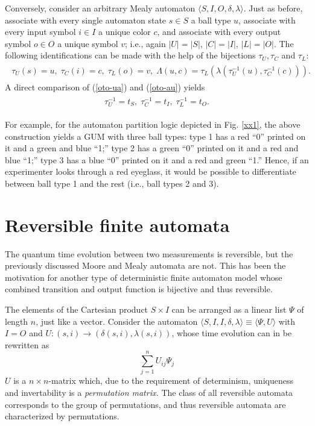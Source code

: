 \documentclass{llncs}
\begin{document}
Conversely,
consider an arbitrary Mealy automaton $\langle S,I,O,\delta ,\lambda \rangle$.
Just as before, associate with every single automaton state $s\in S$
a ball type $u$,
associate with every input symbol $i\in I$
a unique color $c$,
and
associate with every output symbol $o\in O$
a unique symbol $v$; i.e., again
$\vert U\vert =\vert S\vert$,
$\vert C\vert =\vert I\vert$,
$\vert L\vert =\vert O\vert$.
The following identifications can be made
with the help of  the bijections $\tau_U,\tau_C$ and $\tau_L$:
\begin{eqnarray}
\begin{array}{llllll}
\tau_U(s)=u, \; \tau_C(i)=c, \;  \tau_L(o)=v, \;
\Lambda  (u,c) = \tau_L (\lambda (\tau_U^{-1}(u),\tau_C^{-1}(c))).
\end{array}
\label{oto-au}
\end{eqnarray}
A direct comparison of
(\ref{oto-ua})
and
(\ref{oto-au})
yields
\begin{eqnarray}
\begin{array}{llllll}
\tau_U^{-1}=t_S, \; \tau_C^{-1}=t_I, \;  \tau_L^{-1}=t_O.
\end{array}
\label{oto-oto}
\end{eqnarray}

For example, for the automaton partition logic
depicted in Fig. \ref{xx1}, the above  construction yields
a GUM with three ball types:
type 1 has a red ``0'' printed on it and a green and blue ``1;''
type 2 has a green ``0'' printed on it and a red and blue ``1;''
type 3 has a blue ``0'' printed on it and a red and green ``1.''
Hence, if an experimenter looks through a red eyeglass, it would be possible
to differentiate between
ball type 1 and the rest (i.e., ball types 2 and 3).

\section{Reversible finite automata}
The quantum time evolution between two measurements is reversible,
but the previously discussed Moore and Mealy automata are not.
This has been the motivation for another type of deterministic finite automaton
model \cite{sv-aut-rev,svozil-ql}
whose combined transition and output function is bijective and thus reversible.

The elements of the Cartesian product
$S\times I$ can be arranged as a linear list $\Psi$ of length
$n$, just like a vector.
Consider the automaton $\langle S,I,I,\delta ,\lambda \rangle \equiv \langle \Psi , U \rangle$
with
$I=O$ and $U:(s,i)\rightarrow (\delta(s,i),\lambda (s,i))$,
whose time evolution can in be rewritten as
\begin{equation}
\sum_{j=1}^n U_{ij}\Psi_j
\end{equation}
$U$ is a $n\times n$-matrix which, due to the requirement
of determinism, uniqueness and invertability is a {\em permutation matrix.}
The class of all reversible automata corresponds to the group of permutations,
and thus reversible automata are characterized by permutations.
\end{document}

